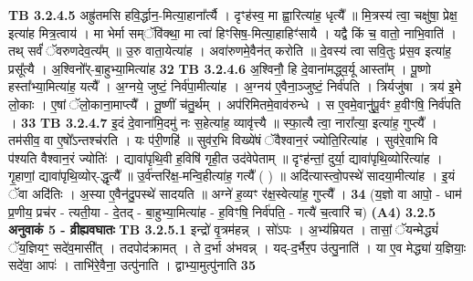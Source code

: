 \documentclass[17pt]{extarticle}
\begin{document}
{{{{{{{{{{{{{{{{{{{                  \newline
                                \textbf{ TB 3.2.4.5} \newline
                  अह्रु॑तमसि हवि॒र्द्धान॒-मित्या॒हाना᳚र्त्यै । दृꣳह॑स्व॒ मा ह्वा॒रित्या॑ह॒ धृत्यै᳚ ॥ मि॒त्रस्य॑ त्वा॒ चक्षु॑षा॒ प्रेक्ष॒ इत्या॑ह मित्र॒त्वाय॑ । मा भेर्मा सम्ॅवि॑क्था॒ मा त्वा॑ हिꣳसिष॒-मित्या॒हाहिꣳ॑सायै । यद्वै किं च॒ वातो॒ नाभि॒वाति॑ । तथ् सर्वं॑ ॅवरुणदेव॒त्य᳚म् ॥ उ॒रु वाता॒येत्या॑ह । अवा॑रुणमे॒वैन॑त् करोति ॥ दे॒वस्य॑ त्वा सवि॒तुः प्र॑स॒व इत्या॑ह॒ प्रसू᳚त्यै । अ॒श्विनो᳚र्-बा॒हुभ्या॒मित्या॑ह \textbf{ 32} \newline
                  \newline
                                \textbf{ TB 3.2.4.6} \newline
                  अ॒श्विनौ॒ हि दे॒वाना॑मद्ध्व॒र्यू आस्ता᳚म् । पू॒ष्णो हस्ता᳚भ्या॒मित्या॑ह॒ यत्यै᳚ । अ॒ग्नये॒ जुष्टं॒ निर्व॑पा॒मीत्या॑ह । अ॒ग्नय॑ ए॒वैना॒ञ्जुष्टं॒ निर्व॑पति । त्रिर्यजु॑षा । त्रय॑ इ॒मे लो॒काः । ए॒षां ॅलो॒काना॒माप्त्यै᳚ । तू॒ष्णीं च॑तु॒र्थम् । अप॑रिमितमे॒वाव॑रुन्धे । स ए॒वमे॒वानु॑पू॒र्वꣳ ह॒वीꣳषि॒ निर्व॑पति । \textbf{ 33} \newline
                  \newline
                                \textbf{ TB 3.2.4.7} \newline
                  इ॒दं दे॒वाना॑मि॒दमु॑ नः स॒हेत्या॑ह॒ व्यावृ॑त्त्यै ॥ स्फा॒त्यै त्वा॒ नारा᳚त्या॒ इत्या॑ह॒ गुप्त्यै᳚ । तम॑सीव॒ वा ए॒षो᳚ऽन्तश्च॑रति । यः प॑री॒णहि॑ ॥ सुव॑र॒भि विख्ये॑षं ॅवैश्वान॒रं ज्योति॒रित्या॑ह । सुव॑रे॒वाभि वि प॑श्यति वैश्वान॒रं ज्योतिः॑ । द्यावा॑पृथि॒वी ह॒विषि॑ गृही॒त उद॑वेपेताम् ॥ दृꣳह॑न्तां॒ दुर्या॒ द्यावा॑पृथि॒व्योरित्या॑ह । गृ॒हाणां॒ द्यावा॑पृथि॒व्योर्-द्धृत्यै᳚ ॥ उ॒र्व॑न्तरि॑क्ष॒-मन्वि॒हीत्या॑ह॒ गत्यै᳚ ( ) ॥ अदि॑त्यास्त्वो॒पस्थे॑ सादया॒मीत्या॑ह । इ॒यं ॅवा अदि॑तिः । अ॒स्या ए॒वैन॑दु॒पस्थे॑ सादयति ॥ अग्ने॑ ह॒व्यꣳ र॑क्ष॒स्वेत्या॑ह॒ गुप्त्यै᳚ । \textbf{ 34} \newline
                  \newline
                                    (य॒ज्ञो वा आपो॒ - धाम॑ प्र॒णीय॒ प्रच॑र - त्यती॒या - दे॒तद् - बा॒हुभ्या॒मित्या॑ह - ह॒विꣳषि॒ निर्व॑पति॒ - गत्यै॑ च॒त्वारि॑ च) \textbf{(A4)} \newline \newline
                \textbf{ 3.2.5     अनुवाकं   5 - व्रीह्यवघातः} \newline
                                \textbf{ TB 3.2.5.1} \newline
                  इन्द्रो॑ वृ॒त्रम॑हन्न् । सो॑ऽपः । अ॒भ्य॑म्रियत । तासां॒ ॅयन्मेद्ध्यं॑ ॅय॒ज्ञियꣳ॒॒ सदे॑व॒मासी᳚त् । तदपोद॑क्रामत् । ते द॒र्भा अ॑भवन्न् । यद्-द॒र्भैर॒प उ॑त्पु॒नाति॑ । या ए॒व मेद्ध्या॑ य॒ज्ञियाः॒ सदे॑वा॒ आपः॑ । ताभि॑रे॒वैना॒ उत्पु॑नाति । द्वाभ्या॒मुत्पु॑नाति \textbf{ 35} \newline
}}}}}}}}}}}}}}}}}}}
\end{document}

